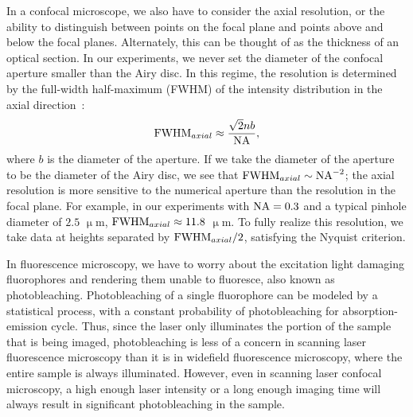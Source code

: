 In a confocal microscope, we also have to consider the axial resolution, or the ability to distinguish between points on the focal plane and points above and below the focal planes.
Alternately, this can be thought of as the thickness of an optical section.
In our experiments, we never set the diameter of the confocal aperture smaller than the Airy disc.
In this regime, the resolution is determined by the full-width half-maximum (FWHM) of the intensity distribution in the axial direction~\cite{RN315}:
\begin{equation}
  {\rm FWHM}_{axial} \approx \frac{\sqrt{2} n b}{{\rm NA}},
\end{equation}
where $b$ is the diameter of the aperture.
If we take the diameter of the aperture to be the diameter of the Airy disc, we see that ${\rm FWHM}_{axial} \sim {\rm NA}^{-2}$; the axial resolution is more sensitive to the numerical aperture than the resolution in the focal plane.
For example, in our experiments with ${\rm NA} = 0.3$ and a typical pinhole diameter of $2.5$ $\upmu$m, ${\rm FWHM}_{axial} \approx 11.8$ $\upmu$m.
To fully realize this resolution, we take data at heights separated by ${\rm FWHM}_{axial}/2$, satisfying the Nyquist criterion.

In fluorescence microscopy, we have to worry about the excitation light damaging fluorophores and rendering them unable to fluoresce, also known as photobleaching.
Photobleaching of a single fluorophore can be modeled by a statistical process, with a constant probability of photobleaching for absorption-emission cycle.
Thus, since the laser only illuminates the portion of the sample that is being imaged, photobleaching is less of a concern in scanning laser fluorescence microscopy than it is in widefield fluorescence microscopy, where the entire sample is always illuminated.
However, even in scanning laser confocal microscopy, a high enough laser intensity or a long enough imaging time will always result in significant photobleaching in the sample.

